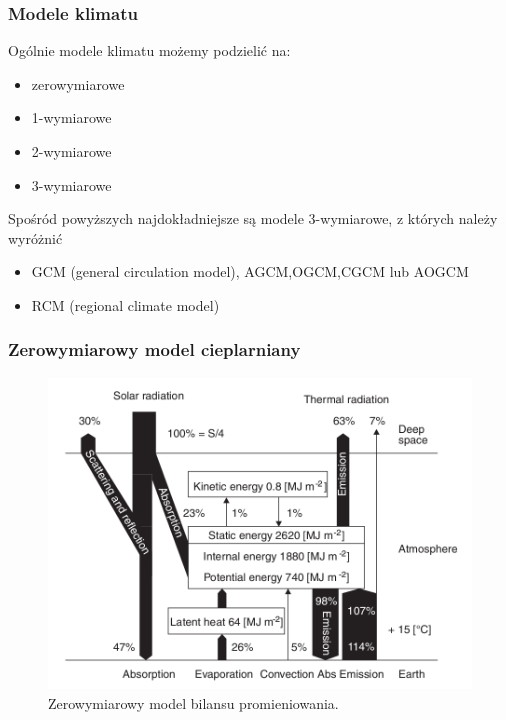\documentclass{beamer}
\begin{document}
\begin{frame}
	\frametitle{Modele klimatu}
	Ogólnie modele klimatu możemy podzielić na:
	\begin{itemize}
		\item zerowymiarowe
		\item 1-wymiarowe
		\item 2-wymiarowe
		\item 3-wymiarowe
	\end{itemize}
	\vspace{0.5cm}
	Spośród powyższych najdokładniejsze są modele 3-wymiarowe, z których należy wyróżnić
	\begin{itemize}
		\item GCM (general circulation model), AGCM,OGCM,CGCM lub AOGCM
		\item RCM (regional climate model)
	\end{itemize}
	
\end{frame}



\begin{frame}
	\frametitle{Zerowymiarowy model cieplarniany}
	\begin{figure}[h]
		\begin{center}
			\includegraphics[width=0.7\linewidth]{images/0D_Model.png}
			\caption{Zerowymiarowy model bilansu promieniowania.\cite{b2}}
		\end{center}
	\end{figure}

\end{frame}
\end{document}
